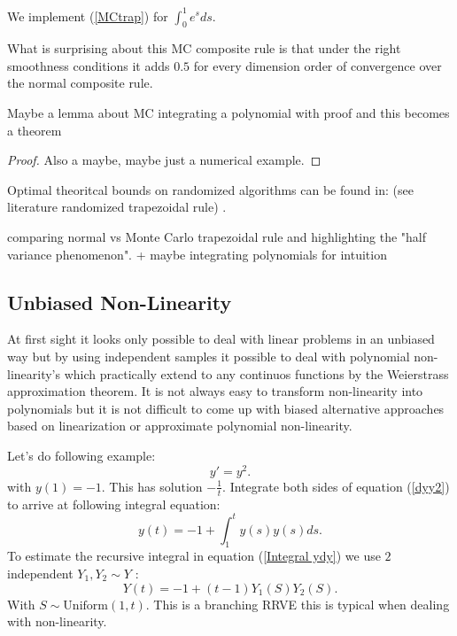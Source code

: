 \documentclass[a4paper,12pt]{article}
\begin{document}
\begin{pythonn}
    We implement (\ref{MCtrap}) for $\int_{0}^{1}e^{s}ds$.
    \vspace*{0.5cm}
\end{pythonn}

What is surprising about this MC composite rule is that
under the right smoothness conditions it adds $0.5$
for every dimension order of convergence over the normal
composite rule.

\begin{lemma}
    Maybe a lemma about MC integrating a polynomial
    with proof and this becomes a theorem
\end{lemma}

\begin{proof}
    Also a maybe, maybe just a numerical example.
\end{proof}

\begin{related}
    Optimal theoritcal bounds on randomized algorithms can be found in:
    (see literature randomized trapezoidal rule)
    \cite{wu_randomised_2020}.
\end{related}

comparing normal vs Monte Carlo trapezoidal rule and highlighting the "half variance phenomenon".
+ maybe integrating polynomials for intuition

\subsection{Unbiased Non-Linearity}
At first sight it looks only possible to deal with linear problems in an unbiased way but by using
independent samples it possible to deal with polynomial non-linearity's which practically extend
to any continuos functions by the Weierstrass approximation theorem.  It is not always easy to
transform non-linearity into polynomials but it is not difficult to come up with
biased alternative approaches based on linearization or approximate polynomial non-linearity.


\begin{example}[$y'=y^{2}$]
    Let's do following example:
    \begin{equation} \label{dyy2}
        y'= y^2.
    \end{equation}
    with $y(1)=-1$. This has solution $-\frac{1}{t}$. Integrate both sides of
    equation (\ref{dyy2}) to arrive at following integral equation:
    \begin{equation} \label{Integral dyy2}
        y(t) = -1 + \int_{1}^{t} y(s) y(s) ds .
    \end{equation}
    To estimate the recursive integral in equation (\ref{Integral ydy}) we use $2$
    independent $Y_{1},Y_{2}\sim Y$ :
    \[
        Y(t) = -1 + (t-1) Y_{1}(S) Y_{2}(S)
        .\]
    With $S \sim \text{Uniform}(1,t)$. This is a branching RRVE this is
    typical when dealing with non-linearity.
\end{example}
\end{document}
